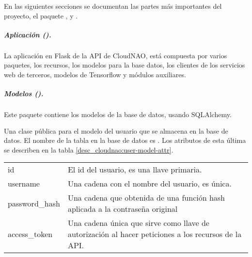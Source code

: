 En las siguientes secciones se documentan las partes más importantes del
proyecto, el paquete ,  y .


\subparagraph{Aplicación ().}
\label{\detokenize{chapter_two/desc_cloudnao:aplicacion-app}}\label{\detokenize{chapter_two/desc_cloudnao:module-app}}
La aplicación en Flask de la API de CloudNAO, está compuesta por varios paquetes,
los recursos, los modelos para la base datos, los clientes de los servicios web de
terceros, modelos de Tensorflow y módulos auxiliares.


\subparagraph{Modelos ().}
\label{\detokenize{chapter_two/desc_cloudnao:module-app.models}}\label{\detokenize{chapter_two/desc_cloudnao:modelos-models}}
Este paquete contiene los modelos de la base de datos, usando SQLAlchemy.
\label{\detokenize{chapter_two/desc_cloudnao:module-app.models.user_model}}\label{\detokenize{chapter_two/desc_cloudnao:module-user_model}}

%


Una clase pública para el modelo del usuario que se almacena en la base
de datos.
El nombre de la tabla en la base de datos es . Los atributos de esta
última se describen en la tabla \ref{desc_cloudnao:user-model-attr}.

\begin{savenotes}\sphinxattablestart
\centering
{}
\sphinxaftercaption
\begin{tabulary}{\linewidth}[t]{|T|T|}
\hline
{}\relax &\relax \\
\hline
id
&
El id del usuario, es una llave primaria.
\\
\hline
username
&
Una cadena con el nombre del usuario, es única.
\\
\hline
password\_hash
&
Una cadena que obtenida de una función hash aplicada a la contraseña original
\\
\hline
access\_token
&
Una cadena única que sirve como llave de autorización al hacer peticiones a los recursos de la API.
\\
\hline
\end{tabulary}
\par
\sphinxattableend\end{savenotes}

